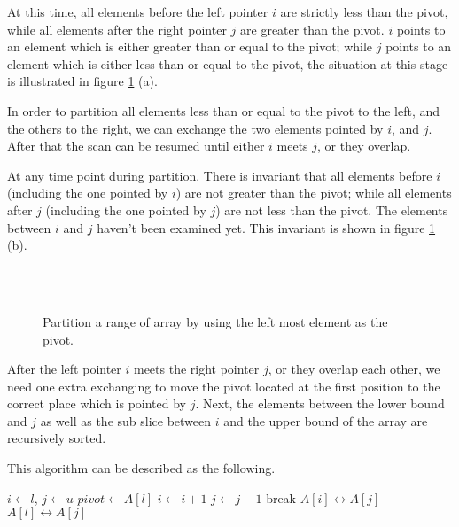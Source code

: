 \documentclass[UTF8]{article}
\begin{document}
At this time, all elements before the left pointer $i$ are strictly less than the pivot, while all
elements after the right pointer $j$ are greater than the pivot. $i$ points to an element which is
 either greater than or equal to the pivot; while $j$ points to an element which is either less than or
equal to the pivot, the situation at this stage is illustrated in figure \ref{fig:partition-2-way} (a).

In order to partition all elements less than or equal to the pivot to the left, and the others to the right,
we can exchange the two elements pointed by $i$, and $j$. After that the scan can be resumed until either
$i$ meets $j$, or they overlap.

At any time point during partition. There is invariant that all elements before $i$ (including the one
pointed by $i$) are not greater than
the pivot; while all elements after $j$ (including the one pointed by $j$) are not less than the pivot.
The elements between $i$ and $j$ haven't been examined yet. This invariant is shown in figure \ref{fig:partition-2-way} (b).

\begin{figure}[htbp]
   \centering
    \\
    \\
   \caption{Partition a range of array by using the left most element as the pivot.}
   \label{fig:partition-2-way}
\end{figure}

After the left pointer $i$ meets the right pointer $j$, or they overlap each other, we need one extra exchanging
to move the pivot located at the first position to the correct place which is pointed by $j$. Next, the
elements between the lower bound and $j$ as well as the sub slice between $i$ and the upper bound of the array
are recursively sorted.

This algorithm can be described as the following.

\begin{algorithmic}[1]
 \Comment{sort range $[l, u)$}
   
    \State $i \gets l$, $j \gets u$
    \State $pivot \gets A[l]$
    \Loop
      \Repeat
        \State $i \gets i + 1$
       
      \Repeat
        \State $j \gets j - 1$
       
        \State break
      \EndIf
      \State {} $A[i] \leftrightarrow A[j]$
    \EndLoop
    \State {} $A[l] \leftrightarrow A[j]$ 
    \State {}
    \State {}
  \EndIf
\EndProcedure
\end{algorithmic}
\end{document}
